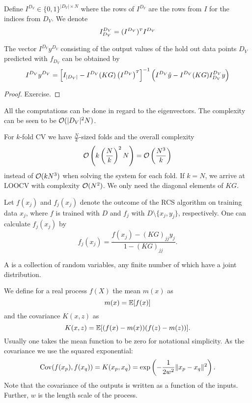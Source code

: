 \documentclass[../lecture-notes.tex]{subfiles}
\begin{document}
Define $I^{D_V} \in \{0, 1\}^{|D_V| \times N}$ where the rows of $I^{D_V}$ are the rows from $I$ for the indices from $D_V$.
We denote
\[
	I_{D_V}^{D_V} = (I^{D_V})^\tp I^{D_V}
\]

\begin{theorem} %
\label{thm:47}
The vector $I^{D_V} y^{D_V}$ consisting of the output values of the hold out data points $D_V$ predicted with $f_{D_V}$ can be obtained by
\[
	I^{D_V} y^{D_V} = \left[I_{|D_V|} - I^{D_V} (KG) \left( I^{D_V} \right)^\tp \right]^{-1} \left( I^{D_V} \hat{y} - I^{D_V} (KG) I_{D_V}^{D_V} y \right)
\]
\end{theorem}
\begin{proof}
Exercise.
\end{proof}
All the computations can be done in regard to the eigenvectors. The complexity can be seen to be $\mathcal{O}(|D_V|^2 N)$.

For $k$-fold CV we have $\frac{N}{k}$-sized folds and the overall complexity
\[
	\mathcal{O} \left( k \left( \frac{N}{k} \right)^2 N \right) = \mathcal{O} \left( \frac{N^3}{k} \right)
\]
instead of $\mathcal{O}(k N^3)$ when solving the system for each fold.
If $k = N$, we arrive at LOOCV %
with complexity $\mathcal{O}(N^2)$.
We only need the diagonal elements of $KG$.
\begin{corollary} %
\label{thm:48}
Let $f(x_j)$ and $f_j(x_j)$ denote the outcome of the RCS algorithm %
on training data $x_j$, where $f$ is trained with $D$ and $f_j$ with $D \setminus \{ x_j, y_j \}$, respectively.
One can calculate $f_j(x_j)$ by 
\[
	f_j(x_j) = \frac{f(x_j) - (KG)_{jj} y_j}{1 - (KG)_{jj}}.
\]
\end{corollary}
\begin{definition} %
\label{thm:49}
A  is a collection of random variables, any finite number of which have a joint distribution.
\end{definition}
We define for a real process $f(X)$ the mean $m(x)$ as
\[
	m(x) = \mathbb{E} [f(x)] 
\]
and the covariance $K(x, z)$ as
\[
	K(x, z) = \mathbb{E} [(f(x) - m(x))(f(z) - m(z))].
\]
Usually one takes the mean function to be zero for notational simplicity.
As the covariance we use the squared exponential:
\[
	\operatorname{Cov}(f(x_p), f(x_q)) = K(x_p, x_q) = \exp \left( - \frac{1}{2 w^2} \| x_p - x_q \|^2 \right).
\]
Note that the covariance of the outputs is written as a function of the inputs.
Further, $w$ is the length scale of the process.
\end{document}
